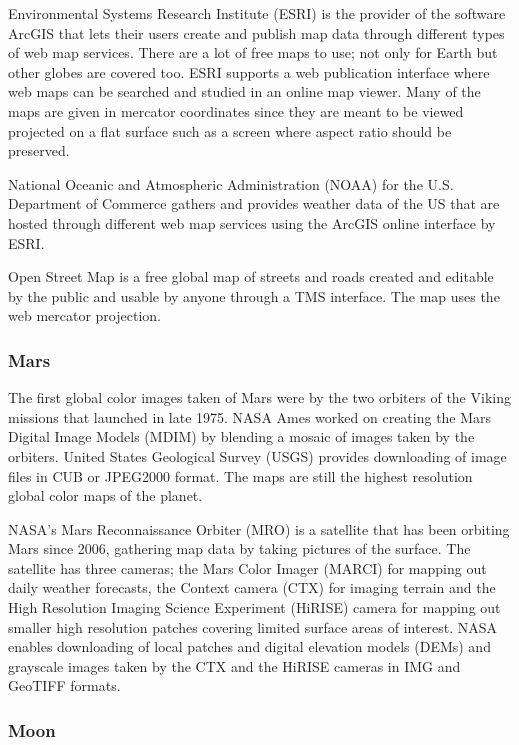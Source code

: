 Environmental Systems Research Institute (ESRI) is the provider of the software ArcGIS that lets their users create and publish map data through different types of web map services. There are a lot of free maps to use; not only for Earth but other globes are covered too. ESRI supports a web publication interface where web maps can be searched and studied in an online map viewer. Many of the maps are given in mercator coordinates since they are meant to be viewed projected on a flat surface such as a screen where aspect ratio should be preserved.

National Oceanic and Atmospheric Administration (NOAA) for the U.S. Department of Commerce gathers and provides weather data of the US that are hosted through different web map services using the ArcGIS online \cite{arcgis} interface by ESRI.

Open Street Map is a free global map of streets and roads created and editable by the public and usable by anyone through a TMS interface. The map uses the web mercator projection.

\subsubsection{Mars}

The first global color images taken of Mars were by the two orbiters of the Viking missions that launched in late 1975. NASA Ames worked on creating the Mars Digital Image Models (MDIM) by blending a mosaic of images taken by the orbiters. United States Geological Survey (USGS) provides downloading of image files in CUB or JPEG2000 format. The maps are still the highest resolution global color maps of the planet.

NASA's Mars Reconnaissance Orbiter (MRO) is a satellite that has been orbiting Mars since 2006, gathering map data by taking pictures of the surface. The satellite has three cameras; the Mars Color Imager (MARCI) for mapping out daily weather forecasts, the Context camera (CTX) for imaging terrain and the High Resolution Imaging Science Experiment (HiRISE) camera for mapping out smaller high resolution patches covering limited surface areas of interest. NASA enables downloading of local patches and digital elevation models (DEMs) and grayscale images taken by the CTX and the HiRISE cameras in IMG and GeoTIFF formats.

\subsubsection{Moon}

